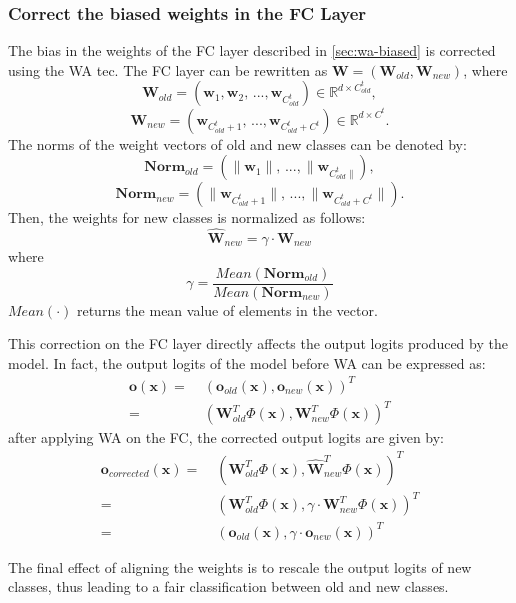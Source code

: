 \subsubsection{Correct the biased weights in the FC Layer}
The bias in the weights of the FC layer described in \autoref{sec:wa-biased} is corrected using the WA tec.  The FC layer can be rewritten as $\textbf{W} = (\textbf{W}_{old}, \textbf{W}_{new})$, where 
$$\textbf{W}_{old} = (\textbf{w}_1, \textbf{w}_2, \, ..., \textbf{w}_{C_{old}^t}) \in \mathbb{R}^{d \times C_{old}^t},$$
$$\textbf{W}_{new} = (\textbf{w}_{C_{old}^t + 1}, \, ..., \textbf{w}_{C_{old}^t + C^t}) \in \mathbb{R}^{d \times C^t}.$$
The norms of the weight vectors of old and new classes can be denoted by:
$$\textbf{Norm}_{old} = (\| \textbf{w}_1 \|,  \, ..., \| \textbf{w}_{C_{old}^t \|}),$$
$$\textbf{Norm}_{new} = (\| \textbf{w}_{C_{old}^t + 1} \|, \, ..., \| \textbf{w}_{C_{old}^t + C^t} \|).$$
Then, the weights for new classes is normalized as follows:
\begin{equation}
    \hat{\textbf{W}}_{new} = \gamma \cdot \textbf{W}_{new}
\end{equation}
where
\begin{equation}
    \gamma = \frac{Mean(\textbf{Norm}_{old} )}{Mean(\textbf{Norm}_{new})}
\end{equation}
$Mean(\cdot)$ returns the mean value of elements in the vector.

This correction on the FC layer directly affects the output logits produced by the model. In fact, the output logits of the model before WA can be expressed as:
\begin{equation}
    \begin{split}
        \textbf{o}(\textbf{x}) = &\; (\textbf{o}_{old}(\textbf{x}), \textbf{o}_{new}(\textbf{x}))^T \\
        = &\; (\textbf{W}_{old}^T \Phi(\textbf{x}), \textbf{W}_{new}^T \Phi(\textbf{x}) )^T
    \end{split}
\end{equation}
after applying WA on the FC, the corrected output logits are given by:
\begin{equation}
    \begin{split}
        \textbf{o}_{corrected}(\textbf{x})
        = &\; (\textbf{W}_{old}^T \Phi(\textbf{x}), \hat{\textbf{W}}_{new}^T \Phi(\textbf{x}))^T \\
        = &\; (\textbf{W}_{old}^T \Phi(\textbf{x}), \gamma \cdot \textbf{W}_{new}^T \Phi(\textbf{x}))^T \\
        = &\; (\textbf{o}_{old}(\textbf{x}), \gamma \cdot \textbf{o}_{new}(\textbf{x}))^T
    \end{split}
\end{equation}

The final effect of aligning the weights is to rescale the output logits of new classes, thus leading to a fair classification between old and new classes.